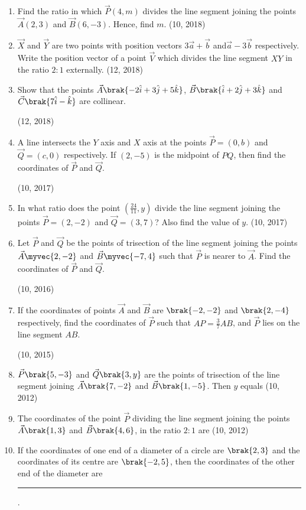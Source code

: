 \begin{enumerate}[label=\thesubsection.\arabic*,ref=\thesubsection.\theenumi]
    \item Find the ratio in which $\vec{P}(4,m)$ divides the line segment joining the points $\vec{A}(2,3)$ and $\vec{B}(6,-3)$. Hence, find $m$. \hfill (10, 2018)
\item $\vec{X}$ and $\vec{Y}$ are two points with position vectors $3\overrightarrow{a}+\overrightarrow{b}$ and$\overrightarrow{a}-3\overrightarrow{b}$ respectively. Write the position vector of a point $\vec{V}$ which divides the line segment $XY$ in the ratio $2:1$ externally.
\hfill (12, 2018) 
\item Show that the points $\vec{A}\brak{-2\hat{i} + 3\hat{j} + 5\hat{k}}$, $\vec{B}\brak{\hat{i} + 2\hat{j} + 3\hat{k}}$ and $\vec{C}\brak{7\hat{i} -\hat{k} }$ are collinear.

\hfill (12, 2018) 
\item A line intersects the $Y$ axis and $X$ axis at the points $\vec{P} = (0, b)$ and $\vec{Q} = (c, 0)$ respectively. If $(2, -5)$ is the midpoint of $PQ$, then find the coordinates of $\vec{P}$ and $\vec{Q}$.

	\hfill (10, 2017)
\item In what ratio does the point $\left(\frac{24}{11}, y\right)$ divide the line segment joining the points $\vec{P} = (2, -2)$ and $\vec{Q} = (3, 7)$? Also find the value of $y$. \hfill (10, 2017)
    \item Let $\vec{P}$ and $\vec{Q}$ be the points of trisection of the line segment joining the points $\vec{A} \myvec{2,-2}$ and $\vec{B} \myvec{-7, 4}$ such that $\vec{P}$ is nearer to $\vec{A}$. Find the coordinates of $\vec{P}$ and $\vec{Q}$.
	    
	    \hfill (10, 2016)
    \item If the coordinates of points $\vec{A}$ and $\vec{B}$ are $\brak{-2, -2}$ and $\brak{2, -4}$ respectively, find the coordinates of $\vec{P}$ such that $AP = \frac{3}{7} AB$, and $\vec{P}$ lies on the line segment $AB$. 

		\hfill (10, 2015)
\item  $\vec{P}\brak{5,-3}$ and $\vec{Q}\brak{3,y}$ are the points of trisection of the line segment joining $\vec{A}\brak{7,-2}$ and $\vec{B}\brak{1,-5}$. Then $y$ equals
\hfill (10, 2012)
\item The coordinates of the point $\vec{P}$ dividing the line segment joining the points $\vec{A}\brak{1,3}$ and $\vec{B}\brak{4,6}$, in the ratio $2:1$ are
\hfill (10, 2012)
\item If the coordinates of one end of a diameter of a circle are $\brak{2,3}$ and the coordinates of its centre are $\brak{-2,5}$, then the coordinates of the other end of the diameter are
\rule{1cm}{0.2pt}.


\end{enumerate}
